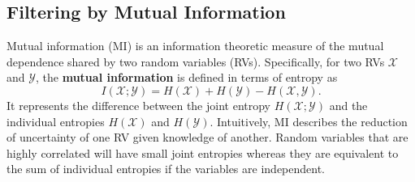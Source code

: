 \subsection{Filtering by Mutual Information}
Mutual information (MI) is an information theoretic measure of the mutual dependence shared by two random variables
(RVs). Specifically, for two RVs $\mathcal{X}$ and $\mathcal{Y}$, the \textbf{mutual information} is defined in terms of entropy as
\begin{equation}
I(\mathcal{X};\mathcal{Y}) = H(\mathcal{X}) + H(\mathcal{Y}) - H(\mathcal{X},\mathcal{Y}).
\end{equation}
It represents the difference between the joint entropy $H(\mathcal{X};\mathcal{Y})$ and the individual entropies $H(\mathcal{X})$ and $H(\mathcal{Y})$. Intuitively, MI describes the reduction of uncertainty of one RV given knowledge of another. Random variables that are highly correlated will have small joint entropies whereas they are equivalent to the sum of individual entropies if the
variables are independent.

